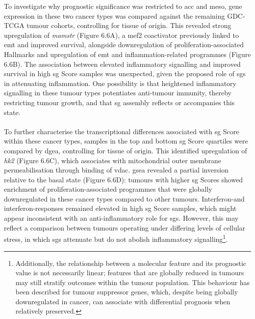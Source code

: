 {To investigate why prognostic significance was restricted to \gls{acc} and \gls{meso}, gene expression in these two cancer types was compared against the remaining GDC-TCGA tumour cohorts\cite{network_cancer_nodate, heath_nci_2021}, controlling for tissue of origin. This revealed strong upregulation of \textit{\gls{mamstr}} (Figure 6.6A), a \gls{mef2} coactivator previously linked to \gls{emt} and improved survival\cite{creemers2006coactivation, pon2015mef2}, alongside downregulation of proliferation-associated Hallmarks and upregulation of \gls{emt} and inflammation-related programmes (Figure 6.6B). The association between elevated inflammatory signalling and improved survival in high \gls{sg} Score samples was unexpected, given the proposed role of \glspl{sg} in attenuating inflammation\cite{paget_stress_2023}. One possibility is that heightened inflammatory signalling in these tumour types potentiates anti-tumour immunity, thereby restricting tumour growth\cite{nishida_role_2025}, and that \gls{sg} assembly reflects or accompanies this state.
\\
\\
To further characterise the transcriptional differences associated with \gls{sg} Score within these cancer types, samples in the top and bottom \gls{sg} Score quartiles were compared by \gls{dgea}, controlling for tissue of origin. This identified upregulation of \textit{\gls{hk2}} (Figure 6.6C), which associates with mitochondrial outer membrane permeabilisation through binding of \gls{vdac}\cite{haloi_structural_2021}. \gls{gsea} revealed a partial inversion relative to the basal state (Figure 6.6D): tumours with higher \gls{sg} Scores showed enrichment of proliferation-associated programmes that were globally downregulated in these cancer types compared to other tumours. Interferon-\alpha and interferon-\gamma responses remained elevated in high \gls{sg} Score samples, which might appear inconsistent with an anti-inflammatory role for \glspl{sg}. However, this may reflect a comparison between tumours operating under differing levels of cellular stress, in which \glspl{sg} attenuate but do not abolish inflammatory signalling\footnote{Additionally, the relationship between a molecular feature and its prognostic value is not necessarily linear; features that are globally reduced in tumours may still stratify outcomes within the tumour population. This behaviour has been described for tumour suppressor genes, which, despite being globally downregulated in cancer, can associate with differential prognosis when relatively preserved\cite{datta_tumor_2020, noauthor_sparc-p53_2020}.}.


}
